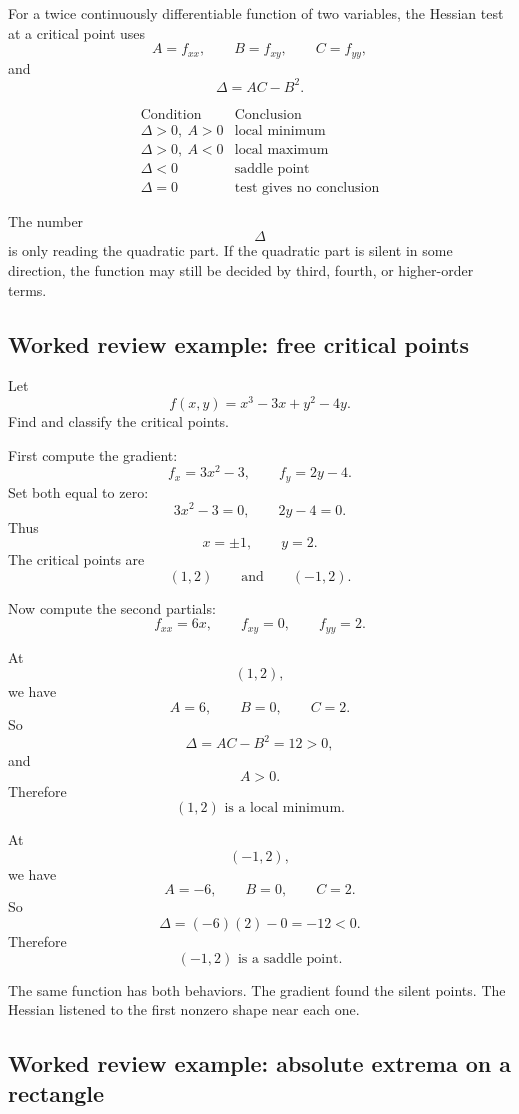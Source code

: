 For a twice continuously differentiable function of two variables, the Hessian test at a
critical point uses
\[
    A=f_{xx},
    \qquad
    B=f_{xy},
    \qquad
    C=f_{yy},
\]
and
\[
    \Delta=AC-B^2.
\]

\[
\begin{array}{c|c}
\text{Condition} & \text{Conclusion} \\ \hline
\Delta>0,\ A>0 & \text{local minimum}\\[1mm]
\Delta>0,\ A<0 & \text{local maximum}\\[1mm]
\Delta<0 & \text{saddle point}\\[1mm]
\Delta=0 & \text{test gives no conclusion}
\end{array}
\]

The number
\[
    \Delta
\]
is only reading the quadratic part.  If the quadratic part is silent in some direction, the
function may still be decided by third, fourth, or higher-order terms.

\subsection{Worked review example: free critical points}

Let
\[
    f(x,y)=x^3-3x+y^2-4y.
\]
Find and classify the critical points.

First compute the gradient:
\[
    f_x=3x^2-3,
    \qquad
    f_y=2y-4.
\]
Set both equal to zero:
\[
    3x^2-3=0,
    \qquad
    2y-4=0.
\]
Thus
\[
    x=\pm1,
    \qquad
    y=2.
\]
The critical points are
\[
    (1,2)
    \qquad\text{and}\qquad
    (-1,2).
\]

Now compute the second partials:
\[
    f_{xx}=6x,
    \qquad
    f_{xy}=0,
    \qquad
    f_{yy}=2.
\]

At
\[
    (1,2),
\]
we have
\[
    A=6,\qquad B=0,\qquad C=2.
\]
So
\[
    \Delta=AC-B^2=12>0,
\]
and
\[
    A>0.
\]
Therefore
\[
\boxed{
    (1,2)\text{ is a local minimum.}
}
\]

At
\[
    (-1,2),
\]
we have
\[
    A=-6,\qquad B=0,\qquad C=2.
\]
So
\[
    \Delta=(-6)(2)-0=-12<0.
\]
Therefore
\[
\boxed{
    (-1,2)\text{ is a saddle point.}
}
\]

The same function has both behaviors.  The gradient found the silent points.  The
Hessian listened to the first nonzero shape near each one.

\subsection{Worked review example: absolute extrema on a rectangle}

